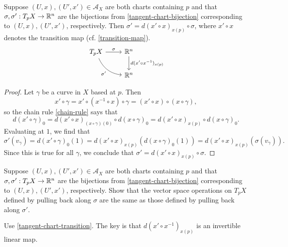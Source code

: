 \begin{lemma} \label{tangent-chart-transition}
	Suppose $(U, x), (U', x') \in \mathscr{A}_X$ are both charts containing $p$ and that $\sigma, \sigma' : T_p X \to \mathbb{R}^n$ are the bijections from \cref{tangent-chart-bijection} corresponding to $(U, x), (U', x')$, respectively. Then $\sigma' = d(x' \circ x)_{x(p)} \circ \sigma$, where $x' \circ x$ denotes the transition map (cf. \cref{transition-map}). 
	\[ \begin{tikzcd} T_p X \ar{r}{\sigma} \ar[bend right]{dr}[swap]{\sigma'} & \R^n \ar{d}{d(x' \circ x^{-1})_{x(p)}} \\ & \R^n \end{tikzcd} \]
\end{lemma}

\begin{proof}
	Let $\gamma$ be a curve in $X$ based at $p$. Then 
	\[ x' \circ \gamma = x' \circ (x^{-1} \circ x) \circ \gamma = (x' \circ x) \circ (x \circ \gamma), \]
	so the chain rule \ref{chain-rule} says that 
	\[ d(x' \circ \gamma)_0 = d(x' \circ x)_{(x \circ \gamma)(0)} \circ d(x \circ \gamma)_0 = d(x' \circ x)_{x(p)} \circ d(x \circ \gamma)_0. \]
	Evaluating at $1$, we find that
	\[ \sigma'(v_\gamma) = d(x' \circ \gamma)_0(1) = d(x' \circ x)_{x(p)}(d(x \circ \gamma)_0(1)) = d(x' \circ x)_{x(p)}(\sigma(v_\gamma)). \]
	Since this is true for all $\gamma$, we conclude that $\sigma' = d(x' \circ x)_{x(p)} \circ \sigma$. 
\end{proof}

\begin{exercise} \label{tangent-chart-independent}
	Suppose $(U, x), (U', x') \in \mathscr{A}_X$ are both charts containing $p$ and that $\sigma, \sigma' : T_p X \to \mathbb{R}^n$ are the bijections from \cref{tangent-chart-bijection} corresponding to $(U, x), (U', x')$, respectively. Show that the vector space operations on $T_p X$ defined by pulling back along $\sigma$ are the same as those defined by pulling back along $\sigma'$. 
	\begin{hint} 
		Use \cref{tangent-chart-transition}. The key is that $d(x' \circ x^{-1})_{x(p)}$ is an invertible linear map. 
	\end{hint}
\end{exercise}

